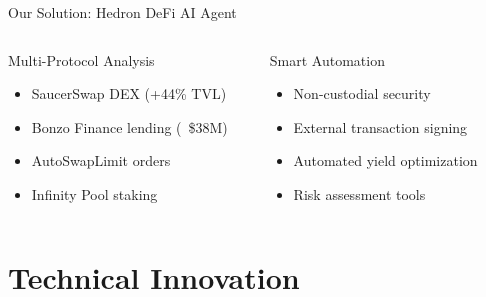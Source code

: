 \documentclass[aspectratio=169]{beamer}
\providecommand{\faShieldAlt}{\faLock}
\begin{document}
\begin{frame}{Our Solution: Hedron DeFi AI Agent}
\begin{columns}[c]
\begin{block}{Multi-Protocol Analysis}
\vspace{0.05cm}
\begin{itemize}
\setlength\itemsep{-0.1em}
\setlength\leftmargin{1em}
\item[\color{success}\faCheckCircle] SaucerSwap DEX (+44\% TVL)
\item[\color{success}\faCheckCircle] Bonzo Finance lending (~\$38M)
\item[\color{success}\faCheckCircle] AutoSwapLimit orders
\item[\color{success}\faCheckCircle] Infinity Pool staking
\end{itemize}
\vspace{0.05cm}
\end{block}

\begin{center}
\end{center}

\vspace{0.05cm}

\begin{block}{Smart Automation}
\vspace{0.05cm}
\begin{itemize}
\setlength\itemsep{-0.1em}
\setlength\leftmargin{1em}
\item[\color{primary}\faLock] Non-custodial security
\item[\color{primary}\faSignature] External transaction signing
\item[\color{primary}\faChartPie] Automated yield optimization
\item[\color{primary}\faUserShield] Risk assessment tools
\end{itemize}
\vspace{0.05cm}
\end{block}
\end{columns}
\end{frame}

\section{Technical Innovation}
\end{document}
